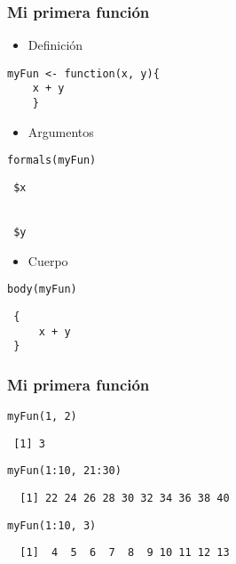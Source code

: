 \documentclass[xcolor={usenames,svgnames,dvipsnames}]{beamer}
\begin{document}
\begin{frame}[fragile]
\frametitle{Mi primera función}
\label{sec-1-3}

\begin{itemize}
\item Definición
\end{itemize}

\lstset{language=R}
\begin{lstlisting}
myFun <- function(x, y){
    x + y
    }
\end{lstlisting}


\begin{itemize}
\item Argumentos
\end{itemize}

\lstset{language=R}
\begin{lstlisting}
formals(myFun)
\end{lstlisting}

\begin{verbatim}
 $x
 
 
 $y
\end{verbatim}

\begin{itemize}
\item Cuerpo
\end{itemize}

\lstset{language=R}
\begin{lstlisting}
body(myFun)
\end{lstlisting}

\begin{verbatim}
 {
     x + y
 }
\end{verbatim}
\end{frame}
\begin{frame}[fragile]
\frametitle{Mi primera función}
\label{sec-1-4}


\lstset{language=R}
\begin{lstlisting}
myFun(1, 2)
\end{lstlisting}

\begin{verbatim}
 [1] 3
\end{verbatim}


\lstset{language=R}
\begin{lstlisting}
myFun(1:10, 21:30)
\end{lstlisting}

\begin{verbatim}
  [1] 22 24 26 28 30 32 34 36 38 40
\end{verbatim}


\lstset{language=R}
\begin{lstlisting}
myFun(1:10, 3)
\end{lstlisting}

\begin{verbatim}
  [1]  4  5  6  7  8  9 10 11 12 13
\end{verbatim}
\end{frame}
\end{document}
